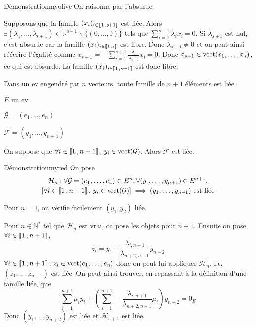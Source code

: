     \begin{demo}{Démonstration}{myolive}
        On raisonne par l’absurde.

        Supposons que la famille $(x_i)_{i \in \left\llbracket 1 \, , s+1 \right\rrbracket}$ est liée. Alors $\exists (\lambda_1,\ldots,\lambda_{s+1}) \in \mathbb{R}^{s+1} \backslash \{ (0,\ldots,0 ) \}$ tels que $\sum\limits_{i=1}^{s+1} \lambda_i x_i = 0$. Si $\lambda_{s+1}$ est nul, c’est absurde car la famille $(x_i)_{i \in \left\llbracket 1 \, , s \right\rrbracket}$ est libre. Donc $\lambda_{s+1} \neq 0$ et on peut ainsi réécrire l’égalité comme $x_{s+1} = - \sum\limits_{i=1}^{s+1} \frac{\lambda_i}{\lambda_{s+1}} x_i = 0$. Donc $x_{s+1} \in \operatorname{vect}(x_1,\ldots,x_{s})$, ce qui est absurde. La famille $(x_i)_{i \in \left\llbracket 1 \, , s+1 \right\rrbracket}$ est donc libre.
    \end{demo}

    \begin{theo}{Dans un ev engendré par $n$ vecteurs, toute famille de $n + 1$ éléments est liée}{}
        \begin{soient}
            \item $E$ un ev
            \item $\mathcal{G} = (e_1,\ldots,e_n)$
            \item $\mathcal{F} = (y_1,\ldots,y_{n+1})$
        \end{soient}
        On suppose que $\forall i \in \left\llbracket 1 \, , n+1 \right\rrbracket, \, y_i \in \operatorname{vect}(\mathcal{G})$.
        Alors $\mathcal{F}$ est liée.
    \end{theo}
    
    \begin{demo}{Démonstration}{myred}
        On pose \begin{multline*}
            \mathcal{H}_n : \forall \mathcal{G} = (e_1,\ldots,e_n) \in E^n, \forall (y_1,\ldots,y_{n+1}) \in E^{n+1}, \\
            \left[\forall i \in \left\llbracket 1 \, , n+1 \right\rrbracket, \, y_i \in \operatorname{vect}(\mathcal{G}) \right] \implies (y_1,\ldots,y_{n+1}) \text{ est liée}
        \end{multline*}

        Pour $n = 1$, on vérifie facilement $(y_1,y_2)$ liée. 
    
        Pour $n \in \mathbb{N}^*$ tel que $\mathcal{H}_n$ est vrai, on pose les objets pour $n+1$. Ensuite on pose $\forall i \in \left\llbracket 1 \, , n+1 \right\rrbracket$, \[ z_i = y_i - \frac{\lambda_{i,n+1}}{\lambda_{n+2,n+1}}y_{n+2} \] 
        $\forall i \in \left\llbracket 1 \, , n+1 \right\rrbracket, \, z_i \in \operatorname{vect}(e_1,\ldots,e_n)$ donc on peut lui appliquer $\mathcal{H}_n$, i.e. $(z_1,\ldots,z_{n+1})$ est liée. On peut ainsi trouver, en repassant à la définition d’une famille liée, que \[ \sum\limits_{i=1}^{n+1} \mu_i y_i + \left(\sum\limits_{i=1}^{n+1} -\frac{\lambda_{i,n+1}}{\lambda_{n+2,n+1}}\mu_i\right)y_{n+2}  = 0_E \]
        Donc $(y_1,\ldots,y_{n+2})$ est liée et $\mathcal{H}_{n+1}$ est liée.
    \end{demo}

